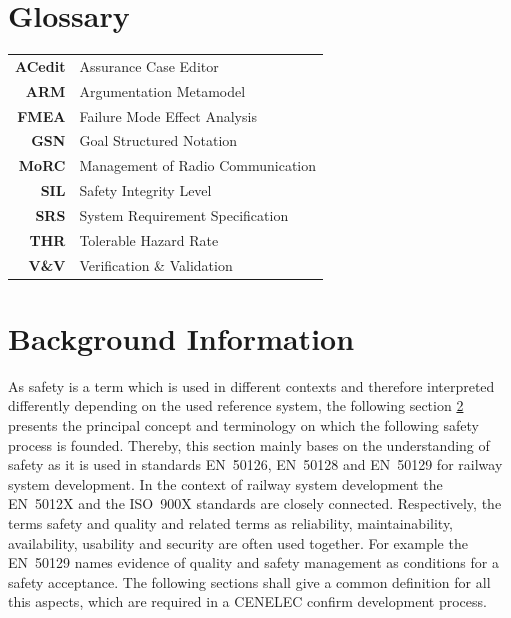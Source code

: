 \documentclass{template/openetcs_report}
\begin{document}

\section{Glossary}
\label{sec:glossary}



\begin{tabular}{rl}
\textbf{ACedit} & Assurance Case Editor \\ 
\textbf{ARM} & Argumentation  Metamodel \\ 
\textbf{FMEA} & Failure Mode Effect Analysis \\ 
\textbf{GSN} & Goal Structured Notation \\ 
\textbf{MoRC} & Management of Radio Communication \\ 
\textbf{SIL} & Safety Integrity Level \\ 
\textbf{SRS} & System Requirement Specification \\ 
\textbf{THR} & Tolerable Hazard Rate \\ 
\textbf{V\&V} & Verification \& Validation \\ 
\end{tabular} 




\section{Background Information}
\label{sec:Background}

As safety is a term which is used in different contexts and therefore interpreted differently depending on the used reference system, the following section \ref{sec:Background} presents the principal concept and terminology on which the following safety process is founded. Thereby, this section mainly bases on the understanding of safety as it is used in standards EN~50126, EN~50128 and EN~50129 for railway system development. In the context of railway system development the EN~5012X and the ISO~900X standards are closely connected. Respectively, the terms safety and quality and related terms as reliability, maintainability, availability, usability and security are often used together. For example the EN~50129 names evidence of quality and safety management as conditions for a safety acceptance. The following sections shall give a common definition for all this aspects, which are required in a CENELEC confirm development process. 
\end{document}
